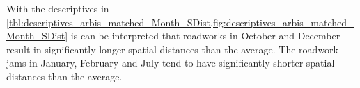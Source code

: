 With the descriptives in \cref{tbl:descriptives_arbis_matched_Month_SDist,fig:descriptives_arbis_matched_Month_SDist} is can be interpreted that roadworks in October and December result in significantly longer spatial distances than the average. The roadwork jams in January, February and July tend to have significantly shorter spatial distances than the average.

